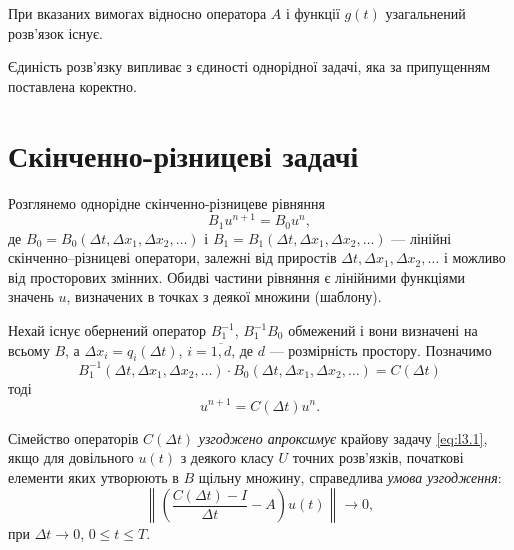 \begin{proposition}
    При вказаних вимогах відносно оператора $A$ і функції $g(t)$ узагальнений розв'язок існує.
\end{proposition}

\begin{remark}
    Єдиність розв'язку випливає з єдиності однорідної задачі, яка за припущенням поставлена коректно. 
\end{remark}

\section{Скінченно-різницеві задачі}

Розглянемо однорідне скінченно-різницеве рівняння 
\begin{equation}
    \label{eq:l3.4'}
    B_1 u^{n + 1} = B_0 u^n,
\end{equation}
де $B_0 = B_0(\Delta t, \Delta x_1, \Delta x_2, \ldots)$ і $B_1 = B_1(\Delta t, \Delta x_1, \Delta x_2, \ldots)$ --- лінійні скінченно–різницеві оператори, залежні від приростів $\Delta t, \Delta x_1, \Delta x_2, \ldots$ і можливо від просторових змінних. Обидві частини рівняння є лінійними функціями значень $u$, визначених в точках з деякої множини (шаблону). \medskip

Нехай існує обернений оператор $B_1^{-1}$, $B_1^{-1} B_0$ обмежений і вони визначені на всьому $B$, а $\Delta x_i = q_i(\Delta t)$, $i = \overline{1,d}$, де $d$ --- розмірність простору. Позначимо
\begin{equation*}
    B_1^{-1}(\Delta t, \Delta x_1, \Delta x_2, \ldots) \cdot B_0(\Delta t, \Delta x_1, \Delta x_2, \ldots) = C(\Delta t)
\end{equation*}
тоді 
\begin{equation}
    \label{eq:l3.5}
    u^{n + 1} = C(\Delta t) u^n.
\end{equation}

\begin{definition}
    Сімейство операторів $C(\Delta t)$ \textit{узгоджено апроксимує} крайову задачу \eqref{eq:l3.1}, якщо для довільного $u(t)$ з деякого класу $U$ точних розв'язків, початкові елементи яких утворюють в $B$ щільну множину, справедлива \textit{умова узгодження}:
    \begin{equation}
        \label{eq:l3.6a}
        \left\| \left( \frac{C(\Delta t) - I}{\Delta t} - A \right) u(t) \right\| \to 0,
    \end{equation}
    при $\Delta t \to 0$, $0 \le t \le T$.
\end{definition}

